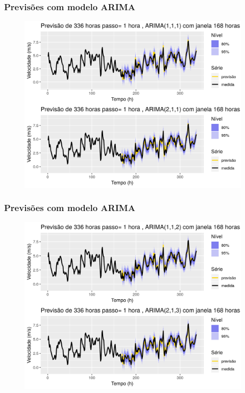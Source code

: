 \documentclass[mathserif,serif]{beamer}
\begin{document}
\begin{frame}
	\frametitle{Previsões com modelo ARIMA}
	\begin{figure}
		\centering
		\includegraphics[scale=0.6]{arima12}
	\end{figure}
\end{frame}

\begin{frame}
	\frametitle{Previsões com modelo ARIMA}
	\begin{figure}
		\centering
		\includegraphics[scale=0.6]{arima34}
	\end{figure}
\end{frame}
\end{document}
